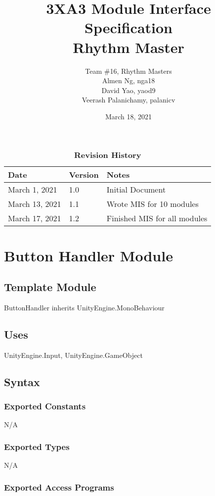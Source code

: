 \documentclass[12pt]{article}
\title{3XA3 Module Interface Specification\\ Rhythm Master}
\author{Team \#16, Rhythm Masters
    \\ Almen Ng, nga18
    \\ David Yao, yaod9
    \\ Veerash Palanichamy, palanicv}
\date{March 18, 2021}
\begin{document}
 
\maketitle
\newpage
\tableofcontents
\listoftables
\listoffigures

\newpage
\begin{table}[h]
\caption{\bf Revision History}
\begin{tabularx}{\textwidth}{p{3cm}p{2cm}X}
\toprule {\bf Date} & {\bf Version} & {\bf Notes}\\
\midrule
March 1, 2021 & 1.0 & Initial Document\\
March 13, 2021 & 1.1 & Wrote MIS for 10 modules\\
March 17, 2021 & 1.2 & Finished MIS for all modules\\
\bottomrule
\end{tabularx}
\end{table}


\newpage

\section {Button Handler Module}

\subsection{Template Module}
ButtonHandler inherits UnityEngine.MonoBehaviour

\subsection {Uses}
UnityEngine.Input, UnityEngine.GameObject

\subsection {Syntax}

\subsubsection {Exported Constants}
N/A
\subsubsection {Exported Types}
N/A
\subsubsection {Exported Access Programs}
\end{document}
